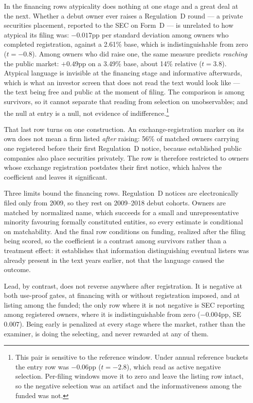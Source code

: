 In the financing rows atypicality does nothing at one stage and a great deal
at the next. Whether a debut owner
ever raises a Regulation~D round --- a private securities placement,
reported to the SEC on Form~D --- is unrelated to how atypical its filing
was: $-0.017$pp per standard deviation among owners who completed
registration, against a 2.61\% base, which is indistinguishable from zero
($t = -0.8$). Among owners who did raise one, the same measure predicts
\emph{reaching} the public market: $+0.49$pp on a 3.49\% base, about 14\%
relative ($t = 3.8$). Atypical language is invisible at the financing stage
and informative afterwards, which is what an investor screen that does not
read the text would look like --- the text being free and public at the
moment of filing. The comparison is among survivors, so it cannot separate
that reading from selection on unobservables; and the null at entry is a
null, not evidence of indifference.\footnote{This pair is sensitive to the
reference window. Under annual reference buckets the entry row was
$-0.06$pp ($t = -2.8$), which read as active negative selection. Per-filing
windows move it to zero and leave the listing row intact, so the negative
selection was an artifact and the informativeness among the funded was
not.}

That last row turns on one construction. An exchange-registration marker on
its own does not mean a firm listed \emph{after} raising: 56\% of matched
owners carrying one registered before their first Regulation~D notice,
because established public companies also place securities privately. The
row is therefore restricted to owners whose exchange registration postdates
their first notice, which halves the coefficient and leaves it significant.

Three limits bound the financing rows. Regulation~D notices are
electronically filed only from 2009, so they rest on 2009--2018 debut
cohorts. Owners are matched by normalized name, which succeeds for a small
and unrepresentative minority favouring formally constituted entities, so
every estimate is conditional on matchability. And the final row conditions
on funding, realized after the filing being scored, so the coefficient is a
contrast among survivors rather than a treatment effect: it establishes that
information distinguishing eventual listers was already present in the text
years earlier, not that the language caused the outcome.

Lead, by contrast, does not reverse anywhere after registration. It is
negative at both use-proof gates, at financing with or without registration
imposed, and at listing among the funded; the only row where it is not negative is
SEC reporting among registered owners, where it is indistinguishable from
zero ($-0.004$pp, SE $0.007$). Being early is penalized at every stage where the
market, rather than the examiner, is doing the selecting, and never rewarded
at any of them.

